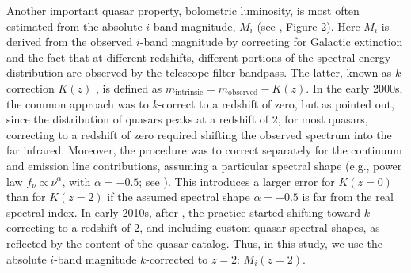 \documentclass[twocolumn]{aastex62}
\begin{document}
Another important quasar property, bolometric luminosity, is most often estimated from the absolute $i$-band magnitude, $M_{i}$ (see \citealt{shen2008}, Figure 2). Here $M_{i}$ is derived from the observed $i$-band magnitude by correcting for Galactic extinction and the fact that at different redshifts, different portions of the spectral energy distribution are observed by the telescope filter bandpass. The latter, known as $k$-correction $K(z)$ \citep{oke1968},  is defined as $m_{\mathrm{intrinsic}} = m_{\mathrm{observed}} - K(z)$. In the early 2000s, the common approach was to $k$-correct to a redshift of zero, but as \citep{richards2006a} pointed out, since the distribution of quasars peaks at a redshift of 2, for most quasars, correcting to a redshift of zero required shifting the observed spectrum into the far infrared. Moreover, the procedure was to correct separately for the continuum and emission line contributions, assuming a particular spectral shape (e.g., power law  $f_{\nu} \propto \nu^{\alpha}$, with $\alpha=-0.5$; see \citealt{vandenberk2001,richards2006a,schneider2010}).  This introduces a larger error for $K(z=0)$ than for $K(z=2)$ if the assumed spectral shape $\alpha=-0.5$ is far from the real spectral index. In early 2010s, after  \citealt{richards2006a, wisotzki2000, blanton2003},  the practice started shifting toward $k$-correcting to a redshift of 2,  and including custom quasar spectral shapes, as reflected by the content of the \cite{shen2011} quasar catalog. Thus, in this study, we use  the absolute $i$-band magnitude $k$-corrected to $z=2$: $M_{i}(z=2)$. 
\end{document}
